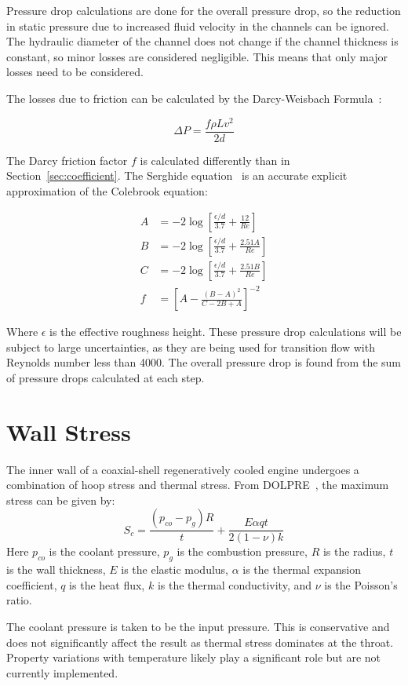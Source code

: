 \documentclass[11pt]{article}
\begin{document}
Pressure drop calculations are done for the overall pressure drop, so the reduction in static pressure due to increased fluid velocity in the channels can be ignored. The hydraulic diameter of the channel does not change if the channel thickness is constant, so minor losses are considered negligible. This means that only major losses need to be considered.

The losses due to friction can be calculated by the Darcy-Weisbach Formula~\cite{2009crane}:

\begin{equation}
  \Delta P = \frac{f \rho L v^2}{2d}
\end{equation}

The Darcy friction factor $f$ is calculated differently than in Section~\ref{sec:coefficient}. The Serghide equation~\cite{2009crane} is an accurate explicit approximation of the Colebrook equation:

\begin{align}
  A & = -2 \log \left[\frac{\epsilon / d}{3.7} + \frac{12}{Re} \right] \nonumber \\
  B & = -2 \log \left[ \frac{\epsilon / d}{3.7} + \frac{2.51A}{Re}\right] \nonumber \\
  C & = -2 \log \left[ \frac{\epsilon / d}{3.7} + \frac{2.51B}{Re}\right] \nonumber \\
  f & = \left[ A - \frac{(B - A)^2 }{C - 2B + A} \right]^{-2}
\end{align}

Where $\epsilon$ is the effective roughness height. These pressure drop calculations will be subject to large uncertainties, as they are being used for transition flow with Reynolds number less than 4000. The overall pressure drop is found from the sum of pressure drops calculated at each step.

\section{Wall Stress}

The inner wall of a coaxial-shell regeneratively cooled engine undergoes a combination of hoop stress and thermal stress. From DOLPRE~\cite{huang_modern_1992}, the maximum stress can be given by:
\begin{equation}
  S_c = \frac{(p_{co} -p_{g}) R}{t} + \frac{E \alpha q t}{2 (1 - \nu)k}
\end{equation}
Here $p_{co}$ is the coolant pressure, $p_g$ is the combustion pressure, $R$ is the radius, $t$ is the wall thickness, $E$ is the elastic modulus, $\alpha$ is the thermal expansion coefficient, $q$ is the heat flux, $k$ is the thermal conductivity, and $\nu$ is the Poisson's ratio.

The coolant pressure is taken to be the input pressure. This is conservative and does not significantly affect the result as thermal stress dominates at the throat. Property variations with temperature likely play a significant role but are not currently implemented.

\printbibliography
\end{document}
